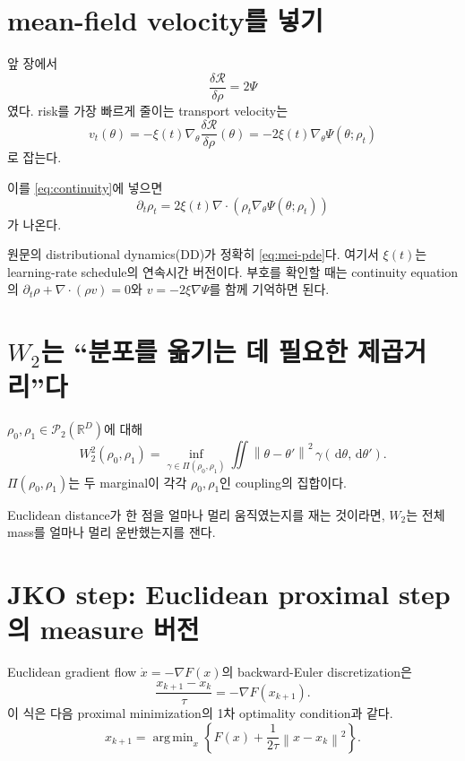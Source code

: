 \documentclass[11pt,a4paper,oneside,openany]{memoir}
\newcommand{\R}{\mathbb{R}}
\newcommand{\Ptwo}{\mathcal{P}_2}
\newcommand{\Risk}{\mathcal{R}}
\newcommand{\grad}{\nabla}
\newcommand{\dd}{\,\mathrm{d}}
\newcommand{\diver}{\nabla\!\cdot}
\newcommand{\norm}[1]{\left\lVert #1\right\rVert}
\DeclareMathOperator*{\argmin}{arg\,min}
\theoremstyle{definition}
\begin{document}
\section{mean-field velocity를 넣기}

앞 장에서
\[
  \frac{\delta\Risk}{\delta\rho}=2\Psi
\]
였다. risk를 가장 빠르게 줄이는 transport velocity는
\[
  v_t(\theta)
  =-\xi(t)\grad_\theta\frac{\delta\Risk}{\delta\rho}(\theta)
  =-2\xi(t)\grad_\theta\Psi(\theta;\rho_t)
\]
로 잡는다.

이를 \eqref{eq:continuity}에 넣으면
\begin{equation}
\boxed{
  \partial_t\rho_t
  =2\xi(t)\diver\!\left(
    \rho_t\grad_\theta\Psi(\theta;\rho_t)
  \right)
}
\label{eq:mei-pde}
\end{equation}
가 나온다.

\begin{paperbox}[--- Mei et al., Eq. (7)--(8)]
원문의 distributional dynamics(DD)가 정확히 \eqref{eq:mei-pde}다.
여기서 $\xi(t)$는 learning-rate schedule의 연속시간 버전이다.
부호를 확인할 때는 continuity equation의 $\partial_t\rho+\nabla\cdot(\rho v)=0$와
$v=-2\xi\nabla\Psi$를 함께 기억하면 된다.
\end{paperbox}

\section{\texorpdfstring{$W_2$}{W2}는 ``분포를 옮기는 데 필요한 제곱거리''다}

$\rho_0,\rho_1\in\Ptwo(\R^D)$에 대해
\begin{equation}
W_2^2(\rho_0,\rho_1)
=\inf_{\gamma\in\Pi(\rho_0,\rho_1)}
\iint\norm{\theta-\theta'}^2\,
\gamma(\dd\theta,\dd\theta').
\label{eq:w2}
\end{equation}
$\Pi(\rho_0,\rho_1)$는 두 marginal이 각각 $\rho_0,\rho_1$인 coupling의 집합이다.

Euclidean distance가 한 점을 얼마나 멀리 움직였는지를 재는 것이라면,
$W_2$는 전체 mass를 얼마나 멀리 운반했는지를 잰다.

\section{JKO step: Euclidean proximal step의 measure 버전}

Euclidean gradient flow $\dot x=-\grad F(x)$의 backward-Euler discretization은
\[
  \frac{x_{k+1}-x_k}{\tau}=-\grad F(x_{k+1}).
\]
이 식은 다음 proximal minimization의 1차 optimality condition과 같다.
\begin{equation}
  x_{k+1}
  =\argmin_x\left\{
     F(x)+\frac1{2\tau}\norm{x-x_k}^2
   \right\}.
\label{eq:prox-euclidean}
\end{equation}
\end{document}
